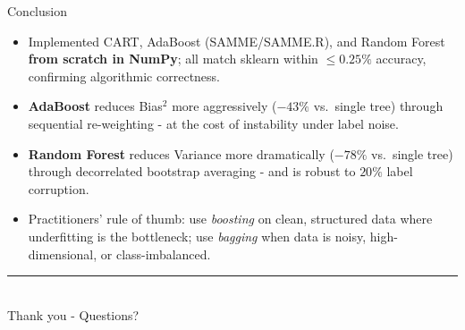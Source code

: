 \documentclass[aspectratio=169,10pt]{beamer}
\begin{document}
\begin{frame}{Conclusion}
  \begin{itemize}
    \item Implemented CART, AdaBoost (SAMME/SAMME.R), and Random Forest \textbf{from scratch in NumPy}; all match sklearn within $\le 0.25\%$ accuracy, confirming algorithmic correctness.
    \item \textbf{AdaBoost} reduces Bias$^2$ more aggressively ($-43\%$ vs.\ single tree) through sequential re-weighting - at the cost of instability under label noise.
    \item \textbf{Random Forest} reduces Variance more dramatically ($-78\%$ vs.\ single tree) through decorrelated bootstrap averaging - and is robust to $20\%$ label corruption.
    \item Practitioners' rule of thumb: use \emph{boosting} on clean, structured data where underfitting is the bottleneck; use \emph{bagging} when data is noisy, high-dimensional, or class-imbalanced.
  \end{itemize}
  \vspace{14pt}
  \centering
  {\color{lectureblue}\rule{0.6\linewidth}{0.8pt}}\\[8pt]
  \large\color{lectureblue} Thank you - Questions?
\end{frame}
\end{document}
